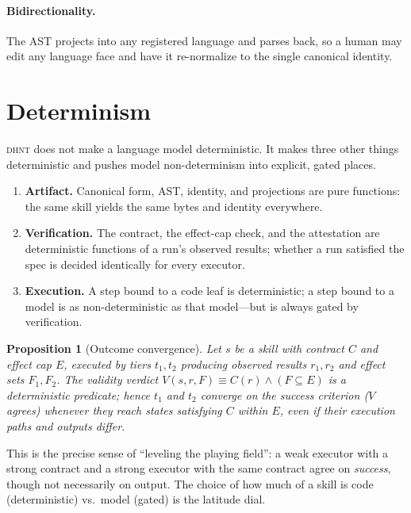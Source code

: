 \documentclass[11pt]{article}
\newcommand{\dhnt}{\textsc{dhnt}}
\newtheorem{proposition}{Proposition}
\begin{document}
\paragraph{Bidirectionality.} The AST projects into any registered language and
parses back, so a human may edit any language face and have it re-normalize to
the single canonical identity.

\section{Determinism}\label{sec:det}

\dhnt{} does not make a language model deterministic. It makes three other things
deterministic and pushes model non-determinism into explicit, gated places.

\begin{enumerate}[topsep=2pt,itemsep=1pt]
\item \textbf{Artifact.} Canonical form, AST, identity, and projections are pure
functions: the same skill yields the same bytes and identity everywhere.
\item \textbf{Verification.} The contract, the effect-cap check, and the
attestation are deterministic functions of a run's observed results; whether a
run satisfied the spec is decided identically for every executor.
\item \textbf{Execution.} A step bound to a code leaf is deterministic; a step
bound to a model is as non-deterministic as that model---but is always gated by
verification.
\end{enumerate}

\begin{proposition}[Outcome convergence]
Let $s$ be a skill with contract $C$ and effect cap $E$, executed by tiers
$t_1,t_2$ producing observed results $r_1,r_2$ and effect sets $F_1,F_2$. The
validity verdict $V(s,r,F) \equiv C(r)\wedge (F\subseteq E)$ is a deterministic
predicate; hence $t_1$ and $t_2$ \emph{converge on the success criterion} ($V$
agrees) whenever they reach states satisfying $C$ within $E$, even if their
execution paths and outputs differ.
\end{proposition}

This is the precise sense of ``leveling the playing field'': a weak executor with
a strong contract and a strong executor with the same contract agree on
\emph{success}, though not necessarily on output. The choice of how much of a
skill is code (deterministic) vs.\ model (gated) is the latitude dial.
\end{document}
